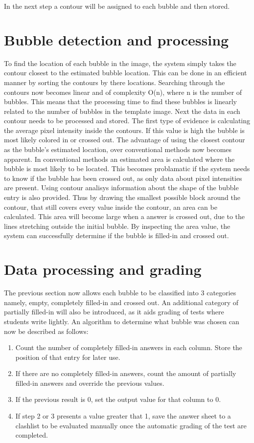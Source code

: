 In the next step a contour will be assigned to each bubble and then stored.

\section{Bubble detection and processing}

To find the location of each bubble in the image, the system simply takes the contour closest to the estimated bubble location. This can be done in an efficient manner by sorting the contours by there locations. Searching through the contours now becomes linear and of complexity O(n), where n is the number of bubbles. This means that the processing time to find these bubbles is linearly related to the number of bubbles in the template image. Next the data in each contour needs to be processed and stored. The first type of evidence is calculating the average pixel intensity inside the contours. If this value is high the bubble is most likely colored in or crossed out. The advantage of using the closest contour as the bubble's estimated location, over conventional methods now becomes apparent. In conventional methods an estimated area is calculated where the bubble is most likely to be located. This becomes problamatic if the system needs to know if the bubble has been crossed out, as only data about pixel intensities are present. Using contour analisys information about the shape of the bubble entry is also provided. Thus by drawing the smallest possible block around the contour, that still covers every value inside the contour, an area can be calculated. This area will become large when a answer is crossed out, due to the lines stretching outside the initial bubble. By inspecting the area value, the system can successfully determine if the bubble is filled-in and crossed out.

\section{Data processing and grading}

The previous section now allows each bubble to be classified into 3 categories namely, empty, completely filled-in and crossed out. An additional category of partially filled-in will also be introduced, as it aids grading of tests where students write lightly. An algorithm to determine what bubble was chosen can now be described as follows:

\begin{enumerate}
\item Count the number of completely filled-in answers in each column. Store the position of that entry for later use.
\item If there are no completely filled-in answers, count the amount of partially filled-in answers and override the previous values.
\item If the previous result is 0, set the output value for that column to 0.
\item If step 2 or 3 presents a value greater that 1, save the answer sheet to a clashlist to be evaluated manually once the automatic grading of the test are completed.
\end{enumerate}


